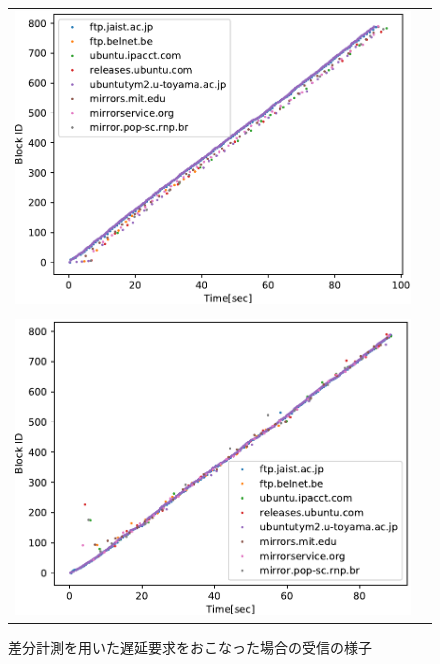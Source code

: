 \documentclass[a4j,12pt]{gradthesis_utf8}
\begin{document}
\begin{figure}[ht]
	\begin{tabular}{cc}
		\begin{minipage}[t]{0.9\hsize}
			\centering
			\includegraphics[width=13cm]{figure/TypicalPlotDelay=NORMALInit=FalseDup=IBRC.pdf}
			\caption{遅延要求なしの場合の受信の様子}
			\label{tpdnpub}
		\end{minipage}\\ \\
		\begin{minipage}[t]{0.9\hsize}
			\centering
			\includegraphics[width=13cm]{figure/TypicalPlotDelay=DIFFInit=TrueDup=IBRC.pdf}
			\caption{差分計測を用いた遅延要求をおこなった場合の受信の様子}
			\label{tpddpub}
		\end{minipage}
	\end{tabular}
\end{figure}
\end{document}
